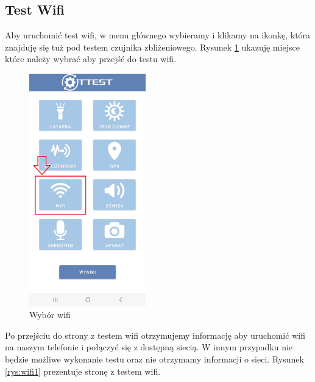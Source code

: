 \newpage


\subsection{Test Wifi}

\hspace{0.60cm}Aby uruchomić test wifi, w menu głównego wybieramy i klikamy na ikonkę, która znajduję się tuż pod testem czujnika zbliżeniowego. Rysunek \ref{rys:wifi} ukazuję miejsce które należy wybrać aby przejść do testu wifi. 

\begin{figure}[!hbt]
	\begin{center}
		\includegraphics[angle=360, width=0.45\textwidth]{rys/punkt6/wifi}
		\caption{Wybór wifi}
		\label{rys:wifi}
	\end{center}
\end{figure}

\newpage 


Po przejściu do strony z testem wifi otrzymujemy informację aby uruchomić wifi na naszym telefonie i połączyć się z dostępną siecią. W innym przypadku nie będzie możliwe wykonanie testu oraz nie otrzymamy informacji o sieci. Rysunek \ref{rys:wifi1} prezentuje stronę z testem wifi.

